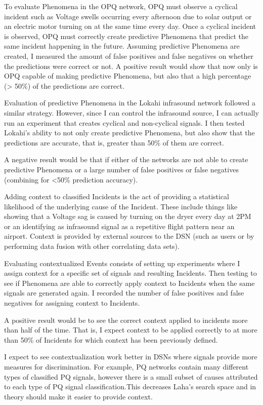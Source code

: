 To evaluate Phenomena in the OPQ network, OPQ must observe a cyclical incident such as Voltage swells occurring every afternoon due to solar output or an electric motor turning on at the same time every day. Once a cyclical incident is observed, OPQ must correctly create predictive Phenomena that predict the same incident happening in the future. Assuming predictive Phenomena are created, I measured the amount of false positives and false negatives on whether the predictions were correct or not. A positive result would show that now only is OPQ capable of making predictive Phenomena, but also that a high percentage (> 50\%) of the predictions are correct.

Evaluation of predictive Phenomena in the Lokahi infrasound network followed a similar strategy. However, since I can control the infrasound source, I can actually run an experiment that creates cyclical and non-cyclical signals. I then tested Lokahi's ability to not only create predictive Phenomena, but also show that the predictions are accurate, that is, greater than 50\% of them are correct.

A negative result would be that if either of the networks are not able to create predictive Phenomena or a large number of false positives or false negatives (combining for <50\% prediction accuracy).

Adding context to classified Incidents is the act of providing a statistical likelihood of the underlying cause of the Incident. These include things like showing that a Voltage sag is caused by turning on the dryer every day at 2PM or an identifying as infrasound signal as a repetitive flight pattern near an airport. Context is provided by external sources to the DSN (such as users or by performing data fusion with other correlating data sets).

Evaluating contextualized Events consists of setting up experiments where I assign context for a specific set of signals and resulting Incidents. Then testing to see if Phenomena are able to correctly apply context to Incidents when the same signals are generated again. I recorded the number of false positives and false negatives for assigning context to Incidents.

A positive result would be to see the correct context applied to incidents more than half of the time. That is, I expect context to be applied correctly to at more than 50\% of Incidents for which context has been previously defined.

I expect to see contextualization work better in DSNs where signals provide more measures for discrimination. For example, PQ networks contain many different types of classified PQ signals, however there is a small subset of causes attributed to each type of PQ signal classification.This decreases Laha's search space and in theory should make it easier to provide context.

